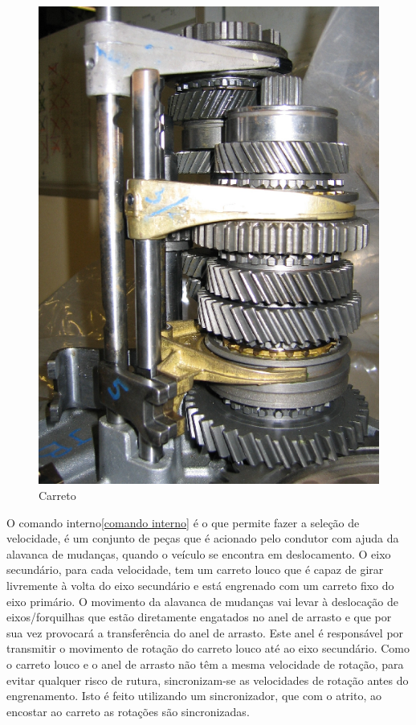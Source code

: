 \begin{figure}[H]
\centering
\includegraphics[scale=1.0]{figs/carretos}
\caption{Carreto}\label{carreto}
\end{figure}

O comando interno\ref{comando interno} é o que permite fazer a seleção de velocidade, é um conjunto de peças que é acionado pelo condutor com ajuda da alavanca de mudanças, quando o veículo se encontra em deslocamento. O eixo secundário, para cada velocidade, tem um carreto louco que é capaz de girar livremente à volta do eixo secundário e está engrenado com um carreto fixo do eixo primário. O movimento da alavanca de mudanças vai levar à deslocação de eixos/forquilhas que estão diretamente engatados no anel de arrasto e que por sua vez provocará a transferência do anel de arrasto. Este anel é responsável por transmitir o movimento de rotação do carreto louco até ao eixo secundário. Como o carreto louco e o anel de arrasto não têm a mesma velocidade de rotação, para evitar qualquer risco de rutura, sincronizam-se as velocidades de rotação antes do engrenamento. Isto é feito utilizando um sincronizador, que com o atrito, ao encostar ao carreto as rotações são sincronizadas.

